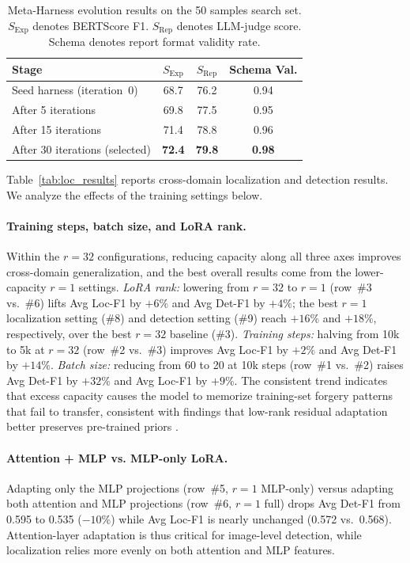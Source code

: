 \documentclass[sigconf, screen, review, anonymous]{acmart}
\begin{document}
\begin{table}[t]
    \caption{Meta-Harness evolution results on the 50 samples search set. $S_{\text{Exp}}$ denotes BERTScore F1. $S_{\text{Rep}}$ denotes LLM-judge score. Schema denotes report format validity rate.}
    \label{tab:harness_results}
    \centering
    \small
    \setlength{\tabcolsep}{5pt}
    \begin{tabular}{lccc}
        \toprule
        Stage & $S_{\text{Exp}}$ & $S_{\text{Rep}}$ & Schema Val. \\
        \midrule
        Seed harness (iteration~0) & 68.7 & 76.2 & 0.94 \\
        After 5 iterations & 69.8 & 77.5 & 0.95 \\
        After 15 iterations & 71.4 & 78.8 & 0.96 \\
        After 30 iterations (selected) & \textbf{72.4} & \textbf{79.8} & \textbf{0.98} \\
        \bottomrule
    \end{tabular}
\end{table}

Table~\ref{tab:loc_results} reports cross-domain localization and detection results. We analyze the effects of the training settings below.
    
\paragraph{Training steps, batch size, and LoRA rank.} Within the $r{=}32$ configurations, reducing capacity along all three axes improves cross-domain generalization, and the best overall results come from the lower-capacity $r{=}1$ settings. \textit{LoRA rank:} lowering from $r{=}32$ to $r{=}1$ (row~\#3 vs.\ \#6) lifts Avg Loc-F1 by $+6\%$ and Avg Det-F1 by $+4\%$; the best $r{=}1$ localization setting (\#8) and detection setting (\#9) reach $+16\%$ and $+18\%$, respectively, over the best $r{=}32$ baseline (\#3). \textit{Training steps:} halving from 10k to 5k at $r{=}32$ (row~\#2 vs.\ \#3) improves Avg Loc-F1 by $+2\%$ and Avg Det-F1 by $+14\%$. \textit{Batch size:} reducing from 60 to 20 at 10k steps (row~\#1 vs.\ \#2) raises Avg Det-F1 by $+32\%$ and Avg Loc-F1 by $+9\%$. The consistent trend indicates that excess capacity causes the model to memorize training-set forgery patterns that fail to transfer, consistent with findings that low-rank residual adaptation better preserves pre-trained priors \cite{yan2024orthogonal}.

\paragraph{Attention + MLP vs. MLP-only LoRA.} Adapting only the MLP projections (row~\#5, $r{=}1$ MLP-only) versus adapting both attention and MLP projections (row~\#6, $r{=}1$ full) drops Avg Det-F1 from 0.595 to 0.535 ($-10\%$) while Avg Loc-F1 is nearly unchanged (0.572 vs.\ 0.568). Attention-layer adaptation is thus critical for image-level detection, while localization relies more evenly on both attention and MLP features.
\end{document}
